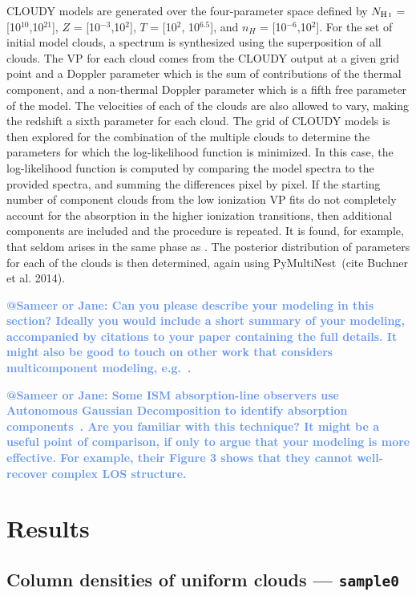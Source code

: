 \documentclass[fleqn,usenatbib]{mnras}
\makeatletter
\newcommand{\atsameer}[1]{\textcolor{CornflowerBlue}{\textbf{@Sameer or Jane: #1}}}
\makeatother
\begin{document}
CLOUDY models are generated over the four-parameter space defined by $N_{\ion{H}{I}}$ = [10$^{10}$,10$^{21}$], $Z$ = [10$^{-3}$,10$^{2}$], $T$ = [10$^{2}$, 10$^{6.5}$], and $n_H$ = [10$^{-6}$,10$^{2}$].  For the set of initial model clouds, a spectrum is synthesized using the superposition of all clouds.  The VP for each cloud comes from the CLOUDY output at a given grid point and a Doppler parameter which is the sum of contributions of the thermal component, and a non-thermal Doppler parameter which is a fifth free parameter of the model. The velocities of each of the clouds are also allowed to vary, making the redshift a sixth parameter for each cloud.
The grid of CLOUDY models is then explored for the combination of the multiple clouds to determine the parameters for which the log-likelihood function is minimized. In this case, the log-likelihood function is computed by comparing the model spectra to the provided spectra, and summing the differences pixel by pixel.
If the starting number of component clouds from the low ionization VP fits do not completely account for the absorption in the higher ionization transitions, then additional components are included and the procedure is repeated. It is found, for example, that  seldom arises in the same phase as . The posterior distribution of parameters for each of the clouds is then determined, again using PyMultiNest~(cite Buchner et al. 2014).


\atsameer{
Can you please describe your modeling in this section?
Ideally you would include a short summary of your modeling, accompanied by citations to your paper containing the full details.
It might also be good to touch on other work that considers multicomponent modeling, e.g.~\cite{Liang2018}.
}

\atsameer{
Some ISM absorption-line observers use Autonomous Gaussian Decomposition to identify absorption components~\citep[e.g.][]{Murray2017}.
Are you familiar with this technique?
It might be a useful point of comparison, if only to argue that your modeling is more effective.
For example, their Figure 3 shows that they cannot well-recover complex LOS structure.
}

\section{Results}
\label{s: results}

\subsection{Column densities of uniform clouds --- \texttt{sample0}}
\label{s: results -- sample0}
\end{document}
